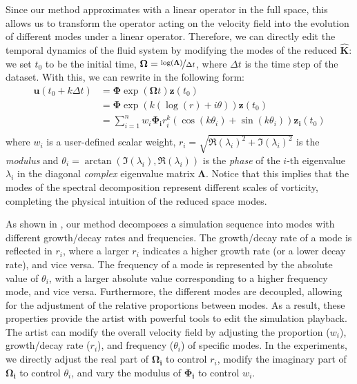 Since our method approximates  with a linear operator in the full space, this allows us to transform the operator acting on the velocity field into the evolution of different modes under a linear operator. Therefore, we can directly edit the temporal dynamics of the fluid system by modifying the modes of the reduced \koopman{} $\bm{\hat{K}}$:
we set $t_0$ to be the initial time, $\bm{\Omega} = \nicefrac{\log(\bm\Lambda)}{\Delta t}$, where $\Delta t$ is the time step of the dataset. With this, we can rewrite  in the following form:
\begin{equation}
    \begin{aligned}
    \bm{u}(t_0 + k\Delta t) &= \bm{\Phi}\exp(\bm{\Omega} t) \bm{z}(t_0) \\
    &= \bm{\Phi}\exp{\left(k(\log(r) + i\theta)\right)} \bm{z}(t_0) \\
    &= \sum_{i = 1}^{n} {w_i} \bm{\Phi_i} r_i^k \left(\cos(k\theta_i) + \sin(k\theta_i)\right) \bm{z_i}(t_0)\\
    \end{aligned}
    \label{eqn:edit_temporal}
\end{equation}
where ${w_i}$ is a user-defined scalar weight, $r_i = \sqrt{\Re(\lambda_i)^2 + \Im(\lambda_i)^2}$ is the \emph{modulus} and $\theta_i = \arctan\left(\Im(\lambda_i), \Re(\lambda_i)\right)$ is the \emph{phase} of the $i$-th eigenvalue $\lambda_i$ in the diagonal \emph{complex} eigenvalue matrix $\bm{\Lambda}$. Notice that this implies that the modes of the spectral decomposition represent different scales of vorticity, completing the physical intuition of the reduced space modes.

As shown in , our method decomposes a simulation sequence into modes with different growth/decay rates and frequencies.
The growth/decay rate of a mode is reflected in $r_i$, where a larger $r_i$ indicates a higher growth rate (or a lower decay rate), and vice versa.
The frequency of a mode is represented by the absolute value of $\theta_i$, with a larger absolute value corresponding to a higher frequency mode, and vice versa.
Furthermore, the different modes are decoupled, allowing for the adjustment of the relative proportions between modes.
As a result, these properties provide the artist with powerful tools to edit the simulation playback. The artist can modify the overall velocity field by adjusting the proportion ($w_i$), growth/decay rate ($r_i$), and frequency ($\theta_i$) of specific modes.
In the experiments, we directly adjust the real part of $\bm{\Omega_i}$ to control $r_i$, modify the imaginary part of $\bm{\Omega_i}$ to control $\theta_i$, and vary the modulus of $\bm{\Phi_i}$ to control $w_i$.

